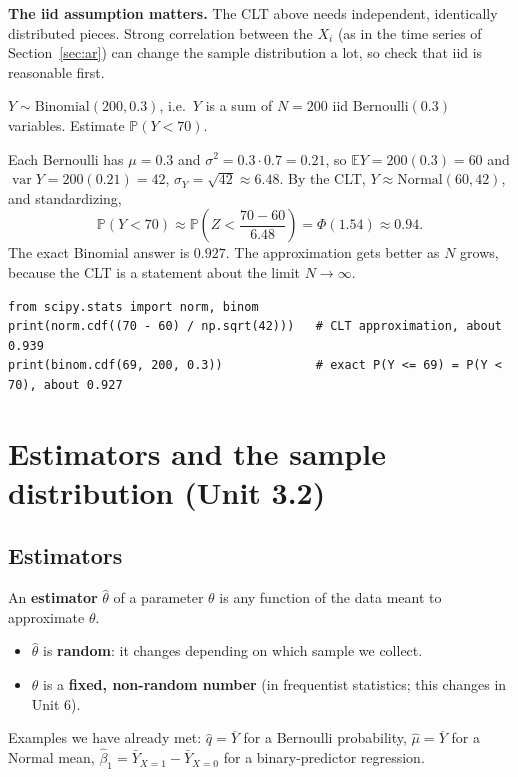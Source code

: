 \documentclass[11pt]{article}
\newcommand{\E}{\mathbb{E}}
\newcommand{\Var}{\operatorname{var}}
\renewcommand{\P}{\mathbb{P}}
\newcommand{\Bern}{\text{Bernoulli}}
\newcommand{\Bin}{\text{Binomial}}
\newcommand{\Norm}{\text{Normal}}
\newcommand{\Ybar}{\overline{Y}}
\begin{document}
\textbf{The iid assumption matters.} The CLT above needs independent, identically distributed pieces. Strong correlation between the
$X_i$ (as in the time series of Section~\ref{sec:ar}) can change the sample distribution a lot, so check that iid is reasonable first.

\begin{examplebox}[title={Example: Binomial approximation (drill from the notes)}]
$Y\sim\Bin(200,0.3)$, i.e.\ $Y$ is a sum of $N=200$ iid $\Bern(0.3)$ variables. Estimate $\P(Y<70)$.

Each Bernoulli has $\mu=0.3$ and $\sigma^2=0.3\cdot0.7=0.21$, so $\E Y=200(0.3)=60$ and $\Var Y=200(0.21)=42$, $\sigma_Y=\sqrt{42}\approx6.48$.
By the CLT, $Y\approx\Norm(60,42)$, and standardizing,
\[
\P(Y<70)\approx\P\!\left(Z<\frac{70-60}{6.48}\right)=\Phi(1.54)\approx0.94.
\]
The exact Binomial answer is $0.927$. The approximation gets better as $N$ grows, because the CLT is a statement about the limit
$N\to\infty$.
\begin{lstlisting}
from scipy.stats import norm, binom
print(norm.cdf((70 - 60) / np.sqrt(42)))   # CLT approximation, about 0.939
print(binom.cdf(69, 200, 0.3))             # exact P(Y <= 69) = P(Y < 70), about 0.927
\end{lstlisting}
\end{examplebox}

\section{Estimators and the sample distribution (Unit 3.2)}
\subsection{Estimators}
\begin{keybox}[title={Estimator}]
An \textbf{estimator} $\hat\theta$ of a parameter $\theta$ is any function of the data meant to approximate $\theta$.
\begin{itemize}[leftmargin=*,itemsep=1pt]
\item $\hat\theta$ is \textbf{random}: it changes depending on which sample we collect.
\item $\theta$ is a \textbf{fixed, non-random number} (in frequentist statistics; this changes in Unit 6).
\end{itemize}
\end{keybox}
Examples we have already met: $\hat q=\Ybar$ for a Bernoulli probability, $\hat\mu=\Ybar$ for a Normal mean,
$\hat\beta_1=\bar Y_{X=1}-\bar Y_{X=0}$ for a binary-predictor regression.
\end{document}
